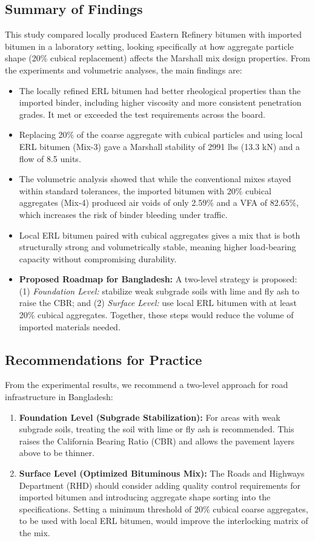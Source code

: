 \documentclass[12pt,a4paper]{article}
\begin{document}
\subsection{Summary of Findings}
This study compared locally produced Eastern Refinery bitumen with imported bitumen in a laboratory setting, looking specifically at how aggregate particle shape (20\% cubical replacement) affects the Marshall mix design properties. From the experiments and volumetric analyses, the main findings are:
\begin{itemize}
    \item The locally refined ERL bitumen had better rheological properties than the imported binder, including higher viscosity and more consistent penetration grades. It met or exceeded the test requirements across the board.
    \item Replacing 20\% of the coarse aggregate with cubical particles and using local ERL bitumen (Mix-3) gave a Marshall stability of 2991 lbs (13.3 kN) and a flow of 8.5 units.
    \item The volumetric analysis showed that while the conventional mixes stayed within standard tolerances, the imported bitumen with 20\% cubical aggregates (Mix-4) produced air voids of only 2.59\% and a VFA of 82.65\%, which increases the risk of binder bleeding under traffic.
    \item Local ERL bitumen paired with cubical aggregates gives a mix that is both structurally strong and volumetrically stable, meaning higher load-bearing capacity without compromising durability.
    \item \textbf{Proposed Roadmap for Bangladesh:} A two-level strategy is proposed: (1) \textit{Foundation Level:} stabilize weak subgrade soils with lime and fly ash to raise the CBR; and (2) \textit{Surface Level:} use local ERL bitumen with at least 20\% cubical aggregates. Together, these steps would reduce the volume of imported materials needed.
\end{itemize}

\subsection{Recommendations for Practice}
From the experimental results, we recommend a two-level approach for road infrastructure in Bangladesh:

\begin{enumerate}
    \item \textbf{Foundation Level (Subgrade Stabilization):} For areas with weak subgrade soils, treating the soil with lime or fly ash is recommended. This raises the California Bearing Ratio (CBR) and allows the pavement layers above to be thinner.
    \item \textbf{Surface Level (Optimized Bituminous Mix):} The Roads and Highways Department (RHD) should consider adding quality control requirements for imported bitumen and introducing aggregate shape sorting into the specifications. Setting a minimum threshold of $20\%$ cubical coarse aggregates, to be used with local ERL bitumen, would improve the interlocking matrix of the mix.
\end{enumerate}
\end{document}
